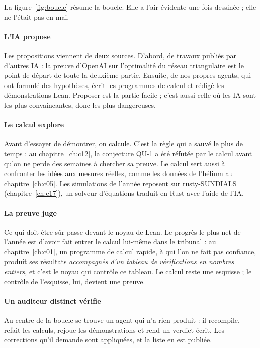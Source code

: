 La figure~\ref{fig:boucle} résume la boucle. Elle a l'air évidente une fois dessinée ; elle ne l'était pas en mai.

\paragraph{L'IA propose} Les propositions viennent de deux sources. D'abord, de travaux publiés par d'autres IA : la
preuve d'OpenAI sur l'optimalité du réseau triangulaire est le point de départ de toute la deuxième partie. Ensuite,
de nos propres agents, qui ont formulé des hypothèses, écrit les programmes de calcul et rédigé les démonstrations
Lean. Proposer est la partie facile ; c'est aussi celle où les IA sont les plus convaincantes, donc les plus
dangereuses.

\paragraph{Le calcul explore} Avant d'essayer de démontrer, on calcule. C'est la règle qui a sauvé le plus de temps :
au chapitre~\ref{ch:c12}, la conjecture QU-1 a été réfutée par le calcul avant qu'on ne perde des semaines à chercher
sa preuve. Le calcul sert aussi à confronter les idées aux mesures réelles, comme les données de l'hélium au
chapitre~\ref{ch:c05}. Les simulations de l'année reposent sur rusty-SUNDIALS (chapitre~\ref{ch:c17}), un solveur
d'équations traduit en Rust avec l'aide de l'IA.

\paragraph{La preuve juge} Ce qui doit être sûr passe devant le noyau de Lean. Le progrès le plus net de l'année est
d'avoir fait entrer le calcul lui-même dans le tribunal : au chapitre~\ref{ch:c01}, un programme de calcul rapide, à
qui l'on ne fait pas confiance, produit ses résultats \emph{accompagnés d'un tableau de vérifications en nombres
entiers}, et c'est le noyau qui contrôle ce tableau. Le calcul reste une esquisse ; le contrôle de l'esquisse, lui,
devient une preuve.

\paragraph{Un auditeur distinct vérifie} Au centre de la boucle se trouve un agent qui n'a rien produit : il
recompile, refait les calculs, rejoue les démonstrations et rend un verdict écrit. Les corrections qu'il demande sont
appliquées, et la liste en est publiée.

